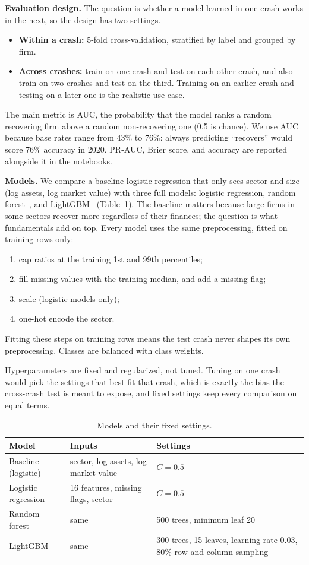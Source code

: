 \documentclass[11pt]{article}
\begin{document}
\textbf{Evaluation design.} The question is whether a model learned in one crash works in the next, so the design has two settings.
\begin{itemize}
  \item \textbf{Within a crash:} 5-fold cross-validation, stratified by label and grouped by firm.
  \item \textbf{Across crashes:} train on one crash and test on each other crash, and also train on two crashes and test on the third. Training on an earlier crash and testing on a later one is the realistic use case.
\end{itemize}
The main metric is AUC, the probability that the model ranks a random recovering firm above a random non-recovering one (0.5 is chance). We use AUC because base rates range from 43\% to 76\%: always predicting ``recovers'' would score 76\% accuracy in 2020. PR-AUC, Brier score, and accuracy are reported alongside it in the notebooks.

\textbf{Models.} We compare a baseline logistic regression that only sees sector and size (log assets, log market value) with three full models: logistic regression, random forest~\cite{breiman2001}, and LightGBM~\cite{ke2017} (Table~\ref{tab:models}). The baseline matters because large firms in some sectors recover more regardless of their finances; the question is what fundamentals add on top. Every model uses the same preprocessing, fitted on training rows only:
\begin{enumerate}[itemsep=0pt]
  \item cap ratios at the training 1st and 99th percentiles;
  \item fill missing values with the training median, and add a missing flag;
  \item scale (logistic models only);
  \item one-hot encode the sector.
\end{enumerate}
Fitting these steps on training rows means the test crash never shapes its own preprocessing. Classes are balanced with class weights.

Hyperparameters are fixed and regularized, not tuned. Tuning on one crash would pick the settings that best fit that crash, which is exactly the bias the cross-crash test is meant to expose, and fixed settings keep every comparison on equal terms.

\begin{table}[h]
\centering\small
\caption{Models and their fixed settings.}
\label{tab:models}
\begin{tabularx}{\textwidth}{llX}
\toprule
Model & Inputs & Settings \\
\midrule
Baseline (logistic) & sector, log assets, log market value & $C = 0.5$ \\
Logistic regression & 16 features, missing flags, sector & $C = 0.5$ \\
Random forest & same & 500 trees, minimum leaf 20 \\
LightGBM & same & 300 trees, 15 leaves, learning rate 0.03, 80\% row and column sampling \\
\bottomrule
\end{tabularx}
\end{table}
\end{document}
